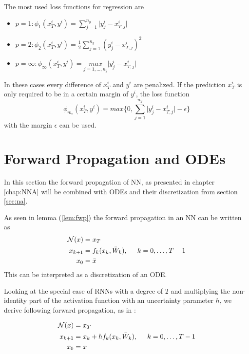 \documentclass[a4paper, 12pt]{scrreprt} %
\begin{document}
The most used loss functions for regression are

\begin{itemize}
	\item $p=1: \phi_1(x^i_T,y^i)=\sum_{j=1}^{n_y}\vert y_j^i - x^i_{T,j} \vert$
	\item $p=2: \phi_2(x^i_T,y^i)=\frac{1}{2}\sum_{j=1}^{n_y}(y_j^i - x^i_{T,j})^2$
	\item $p=\infty: \phi_{\infty}(x^i_T,y^i)=\underset{j=1,\dots,n_y}{max}\vert y_j^i - x^i_{T,j} \vert$
\end{itemize}

In these cases every difference of $x^i_{T}$ and $y^i$ are penalized. If the prediction $x^i_{T}$ is only required to be in a certain margin of $y^i$, the loss function
\begin{equation*}
\phi_{m_{\epsilon}}(x^i_T,y^i) = max\{0,\sum_{j=1}^{n_y}\vert y_j^i - x^i_{T,j} \vert - \epsilon\}
\end{equation*}
with the margin $\epsilon$ can be used.

\section{Forward Propagation and \acp{ODE}}
In this section the forward propagation of \ac{NN}, as presented in chapter \ref{chap:NNA} will be combined with \acp{ODE} and their discretization from section \ref{sec:na}.  \cite{mpbafdl} \newline

As seen in lemma (\ref{lem:fwp}) the forward propagation in an \ac{NN} can be written as
\begin{align*}
\mathcal{N}(x) &= x_T \\
x_{k+1} &= f_{k}(x_{k},\bar{W}_{k}) , \hspace{0.5cm}k = 0, \dots, T-1 \\
x_0 &= \bar{x} 
\end{align*}
This can be interpreted as a discretization of an \ac{ODE}. 

Looking at the special case of \acp{RNN} with a degree of 2 and multiplying the non-identity part of the activation function with an uncertainty parameter $h$, we derive following forward propagation, as in \cite{safdnn}:

\begin{align}
\begin{split}
\mathcal{N}(x) &= x_T \\
x_{k+1} &= x_k + h f_{k}(x_{k},\bar{W}_{k}) , \hspace{0.5cm}k = 0, \dots, T-1 \\
x_0 &= \bar{x} 
\end{split}
\label{eq:ResNetFwEul}
\end{align}
\end{document}
